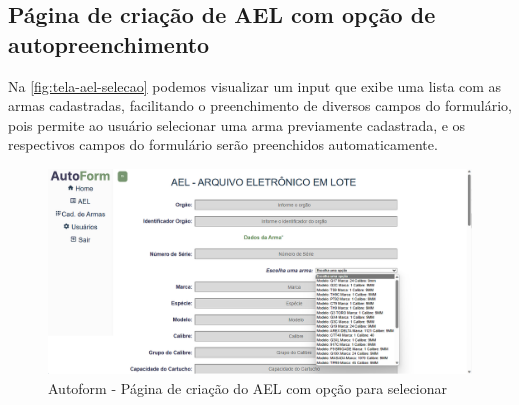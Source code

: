 \subsection{Página de criação de AEL com opção de autopreenchimento}
Na \autoref{fig:tela-ael-selecao} podemos visualizar um input que exibe uma lista com as armas cadastradas, facilitando o preenchimento de diversos campos do formulário,
pois permite ao usuário selecionar uma arma previamente cadastrada, e os respectivos campos do formulário serão preenchidos automaticamente.

\begin{figure}[H]
    \caption{\label{fig:tela-ael-selecao}Autoform - Página de criação do AEL com opção para selecionar}
    \begin{center}
        \includegraphics[scale=0.45]{imagens/autoform-ael-selecao.png}
    \end{center}
\end{figure}

